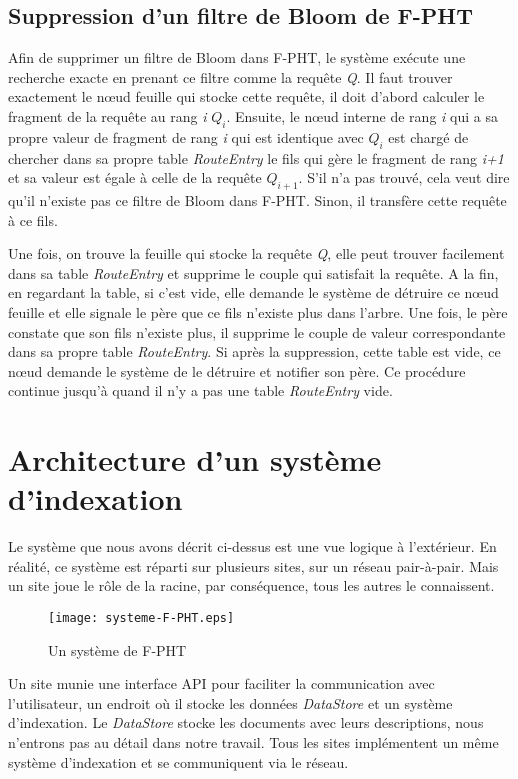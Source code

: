 \documentclass[a4paper,11pt]{report}
\begin{document}
\section{Suppression d'un filtre de Bloom de F-PHT}
	Afin de supprimer un filtre de Bloom dans F-PHT, le système exécute une recherche exacte en prenant ce filtre comme la requête \textit{Q}. Il faut trouver exactement le nœud feuille qui stocke cette requête, il doit d'abord calculer le fragment de la requête au rang \textit{i} \textit{$Q_i$}. Ensuite, le nœud interne de rang \textit{i} qui a sa propre valeur de fragment de rang \textit{i} qui est identique avec \textit{$Q_i$} est chargé de chercher dans sa propre table \textit{RouteEntry} le fils qui gère le fragment de rang \textit{i+1} et sa valeur est égale à celle de la requête \textit{$Q_{i+1}$}. S'il n'a pas trouvé, cela veut dire qu'il n'existe pas ce filtre de Bloom dans F-PHT. Sinon, il transfère cette requête à ce fils.
	
	Une fois, on trouve la feuille qui stocke la requête \textit{Q}, elle peut trouver facilement dans sa table \textit{RouteEntry} et supprime le couple qui satisfait la requête. A la fin, en regardant la table, si c'est vide, elle demande le système de détruire ce nœud feuille et elle signale le père que ce fils n'existe plus dans l'arbre. Une fois, le père constate que son fils n'existe plus, il supprime le couple de valeur correspondante dans sa propre table \textit{RouteEntry}. Si après la suppression, cette table est vide, ce nœud demande le système de le détruire et notifier son père. Ce procédure continue jusqu'à quand il n'y a pas une table \textit{RouteEntry} vide.
	
\chapter{Architecture d'un système d'indexation}

	Le système que nous avons décrit ci-dessus est une vue logique à l'extérieur. En réalité, ce système est réparti sur plusieurs sites, sur un réseau pair-à-pair. Mais un site joue le rôle de la racine, par conséquence, tous les autres le connaissent.
	
	\begin{figure}[!htbp]
	\centering
	\texttt{[image: systeme-F-PHT.eps]}
	\caption{Un système de F-PHT}
	\label{systemeF-PHT}
	\end{figure}	
	
\newpage

	Un site munie une interface API pour faciliter la communication avec l'utilisateur, un endroit où il stocke les données \textit{DataStore} et un système d'indexation. Le \textit{DataStore} stocke les documents avec leurs descriptions, nous n'entrons pas au détail dans notre travail. Tous les sites implémentent un même système d'indexation et se communiquent via le réseau.
	
\end{document}
